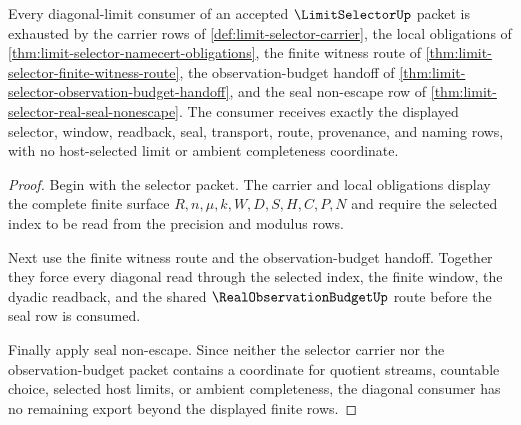 \begin{theorem}
\label{thm:limit-selector-diagonal-consumer-exhaustion}
Every diagonal-limit consumer of an accepted $\LimitSelectorUp$ packet is exhausted by the carrier rows of \autoref{def:limit-selector-carrier}, the local obligations of \autoref{thm:limit-selector-namecert-obligations}, the finite witness route of \autoref{thm:limit-selector-finite-witness-route}, the observation-budget handoff of \autoref{thm:limit-selector-observation-budget-handoff}, and the seal non-escape row of \autoref{thm:limit-selector-real-seal-nonescape}. The consumer receives exactly the displayed selector, window, readback, seal, transport, route, provenance, and naming rows, with no host-selected limit or ambient completeness coordinate.
\end{theorem}
\begin{proof}
Begin with the selector packet. The carrier and local obligations display the complete finite surface $R,n,\mu,k,W,D,S,H,C,P,N$ and require the selected index to be read from the precision and modulus rows.

Next use the finite witness route and the observation-budget handoff. Together they force every diagonal read through the selected index, the finite window, the dyadic readback, and the shared $\RealObservationBudgetUp$ route before the seal row is consumed.

Finally apply seal non-escape. Since neither the selector carrier nor the observation-budget packet contains a coordinate for quotient streams, countable choice, selected host limits, or ambient completeness, the diagonal consumer has no remaining export beyond the displayed finite rows.
\end{proof}

